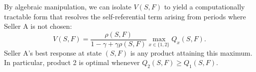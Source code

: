 \documentclass[opre]{informs3} %
\begin{document}
By algebraic manipulation, we can isolate $V(S, F)$ to yield a computationally tractable form that resolves the self-referential term arising from periods where Seller A is not chosen:
\begin{equation}
    V(S, F) = \frac{\rho(S, F)}{1 - \gamma + \gamma \rho(S, F)} \max_{x \in \{1, 2\}} Q_x(S,F).
\end{equation}
Seller A's best response at state $(S,F)$ is any product attaining this maximum. In particular, product 2 is optimal whenever $Q_2(S,F) \geq Q_1(S,F)$.







\end{document}
